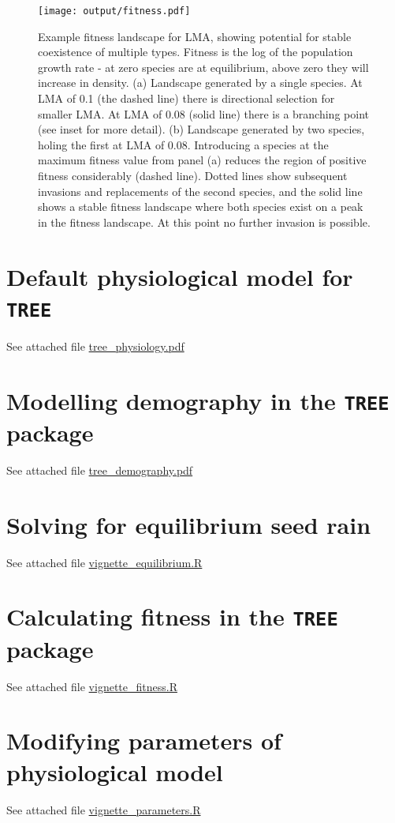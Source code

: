 \documentclass[a4paper,11pt]{article}
\begin{document}
\newpage

\begin{figure}[h!]
\centering
\texttt{[image: output/fitness.pdf]}
\caption{Example fitness landscape for LMA, showing potential for stable
coexistence of multiple types.  Fitness is the log of the population growth
rate - at zero species are at equilibrium, above zero they will increase in
density.  (a) Landscape generated by a single species.  At LMA of 0.1 (the
dashed line) there is directional selection for smaller LMA.  At LMA of 0.08
(solid line) there is a branching point (see inset for more detail).  (b)
Landscape generated by two species, holing the first at LMA of 0.08.
Introducing a species at the maximum fitness value from panel (a) reduces the
region of positive fitness considerably (dashed line).  Dotted lines show
subsequent invasions and replacements of the second species, and the solid
line shows a stable fitness landscape where both species exist on a peak in
the fitness landscape.  At this point no further invasion is possible.}
\label{fig:fitness}
\end{figure}

\clearpage

\begin{appendices}\label{sec:appendices}

\section{Default physiological model for \texttt{TREE}}\label{sec:FFW16}

See attached file \url{tree_physiology.pdf}

\section{Modelling demography in the \texttt{TREE} package}\label{sec:demography}

See attached file \url{tree_demography.pdf}

\section{Solving for equilibrium seed rain}\label{sec:seed}

See attached file \url{vignette_equilibrium.R}

\section{Calculating fitness in the \texttt{TREE} package}\label{sec:fitness}

See attached file \url{vignette_fitness.R}

\section{Modifying parameters of physiological model}\label{sec:parameters}

See attached file \url{vignette_parameters.R}

\end{appendices}
\end{document}
